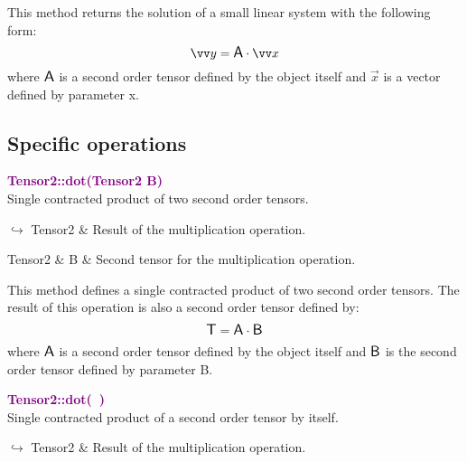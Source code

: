 This method returns the solution of a small linear system with the following form:
\begin{equation*}
\overrightarrow{y} = \A \cdot \overrightarrow{x}
\end{equation*}
where $\mbox{\large\ensuremath{\mathsf{A}}}$ is a second order tensor defined by the object itself and $\overrightarrow{x}$ is a vector defined by parameter x.

\subsection{Specific operations}

\textcolor{purple}{\textbf{Tensor2::dot(Tensor2 B)}}\label{Tensor2::dot(Tensor2 B)}\\
Single contracted product of two second order tensors.\vspace*{-0.5em}
\begin{tcolorbox}[grow to left by=-1cm, width=\textwidth-1cm,myArgs,tabularx={l|R}]
$\hookrightarrow$ Tensor2 & Result of the multiplication operation.
\end{tcolorbox}

\begin{tcolorbox}[width=\textwidth,myArgs,tabularx={ll|R}]
Tensor2 & B & Second tensor for the multiplication operation.
\end{tcolorbox}

This method defines a single contracted product of two second order tensors.
The result of this operation is also a second order tensor defined by:
\begin{equation*}
\mbox{\large\ensuremath{\mathsf{T}}} = \mbox{\large\ensuremath{\mathsf{A}}} \cdot \mbox{\large\ensuremath{\mathsf{B}}}
\end{equation*}
where $\mbox{\large\ensuremath{\mathsf{A}}}$ is a second order tensor defined by the object itself and $\mbox{\large\ensuremath{\mathsf{B}}}$ is the second order tensor defined by parameter B.

\textcolor{purple}{\textbf{Tensor2::dot(~)}}\label{Tensor2::dot()}\\
Single contracted product of a second order tensor by itself.\vspace*{-0.5em}
\begin{tcolorbox}[grow to left by=-1cm, width=\textwidth-1cm,myArgs,tabularx={l|R}]
$\hookrightarrow$ Tensor2 & Result of the multiplication operation.
\end{tcolorbox}

